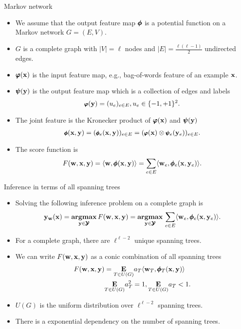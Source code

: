 \documentclass[first=dgreen,second=purple,logo=yellowexc]{aaltoslides}
\begin{document}
\begin{frame}{Markov network}
	\begin{itemize}\footnotesize
		\item We assume that the output feature map $\pmb \phi$ is a potential function on a Markov network $G=(E,V)$.
		\item $G$ is a complete graph with $|V| = \ell$ nodes and $|E| = \frac{\ell(\ell-1)}{2}$ undirected edges.
		\item $\pmb \varphi(\mathbf {x})$ is the input feature map, e.g., bag-of-words feature of an example $\mathbf {x}$.
		\item $\pmb \psi(\mathbf {y})$ is the output feature map which is a collection of edges and labels
		\begin{align*}\footnotesize
			\pmb \varphi(\mathbf {y}) = (u_{e})_{e\in E},u_e\in\{-1,+1\}^2.
		\end{align*}
		\item The joint feature is the Kronecker product of $\pmb \varphi(\mathbf {x})$ and $\pmb \psi(\mathbf {y})$
		\begin{align*}\footnotesize
			\pmb \phi(\mathbf {x},\mathbf {y}) = (\pmb \phi_e(\mathbf {x},\mathbf {y}))_{e\in E}=(\pmb \varphi(\mathbf {x})\otimes\pmb \psi_e(\mathbf {y}_e))_{e\in E}.
		\end{align*}
		\item The score function is 
		\begin{align*}
			F(\mathbf {w},\mathbf {x},\mathbf {y}) = \langle \mathbf {w}, \pmb \phi(\mathbf {x},\mathbf {y}) \rangle = \sum_{e\in E}\langle \mathbf {w}_e, \pmb \phi_e(\mathbf {x},\mathbf {y}_e) \rangle.
		\end{align*}
	\end{itemize}
\end{frame}

\begin{frame}{Inference in terms of all spanning trees}
	\begin{itemize}
		\item Solving the following inference problem on a complete graph is \nphard
		\begin{align*}
			\mathbf {y}_{\mathbf {w}}(\mathbf {x}) = \underset{\mathbf {y}\in\pmb {\mathcal{Y}}}{\textbf{argmax}}\,F(\mathbf {w},\mathbf {x},\mathbf {y})  = \underset{\mathbf {y}\in\pmb {\mathcal{Y}}}{\textbf{argmax}}\,\sum_{e\in E}\langle \mathbf {w}_e, \pmb \phi_e(\mathbf {x},\mathbf {y}_e) \rangle. 
		\end{align*}
		\item For a complete graph, there are $\ell^{\ell-2}$ unique spanning trees.
		\item We can write $F(\mathbf {w},\mathbf {x},\mathbf {y})$ as a conic combination of all spanning trees
		\begin{align*}
			F(\mathbf {w},\mathbf {x},\mathbf {y}) &= \underset{T\in U(G)}{\textbf{E}}a_T\langle \mathbf {w}_T, \pmb \phi_T(\mathbf {x},\mathbf {y}) \rangle\\
			  &\underset{T\in U(G)}{\textbf{E}}a_T^2=1,  \underset{T\in U(G)}{\textbf{E}}a_T<1.
		\end{align*}
		\item $U(G)$ is the uniform distribution over $\ell^{\ell-2}$ spanning trees.
		\item There is a exponential dependency on the number of spanning trees.
	\end{itemize}
\end{frame}
\end{document}
